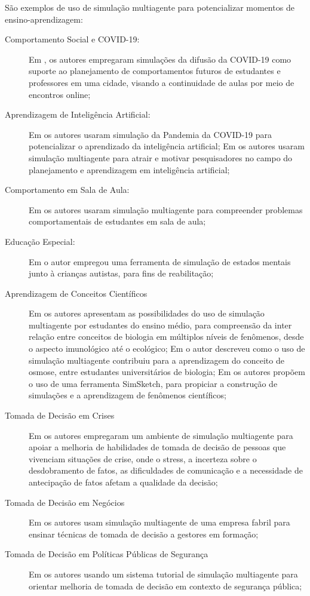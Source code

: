São exemplos de uso de simulação multiagente para potencializar momentos de ensino-aprendizagem:
\begin{description}
\item [Comportamento Social e COVID-19:] Em \cite{santoro_building_2020}, os autores empregaram simulações da difusão da COVID-19 como suporte ao planejamento de comportamentos futuros de estudantes e professores em uma cidade, visando a continuidade de aulas por meio de encontros online; 
\item [Aprendizagem de Inteligência Artificial:] Em \cite{juarez_analysis_2022} os autores usaram simulação da Pandemia da COVID-19 para potencializar o aprendizado da inteligência artificial; Em \cite{filho_proposal_2007} os autores usaram simulação multiagente para atrair e motivar pesquisadores no campo do planejamento e aprendizagem em inteligência artificial;
\item [Comportamento em Sala de Aula:] Em \cite{zhao_research_2011} os autores usaram simulação multiagente para compreender problemas comportamentais de estudantes em sala de aula;
\item [Educação Especial:] Em \cite{galitsky_computational_2013} o autor empregou uma ferramenta de simulação de estados mentais junto à crianças autistas, para fins de reabilitação;
\item [Aprendizagem de Conceitos Científicos]
Em \cite{wilensky_thinking_2006} os autores apresentam as possibilidades do uso de simulação multiagente por estudantes do ensino médio, para compreensão da inter relação entre conceitos de biologia em múltiplos níveis de fenômenos, desde o aspecto imunológico até o ecológico; Em \cite{kottonau_interactive_2011} o autor descreveu como o uso de simulação multiagente contribuiu para a aprendizagem do conceito de osmose, entre estudantes universitários de biologia; Em \cite{bollen_simsketch_2013} os autores propõem o uso de uma ferramenta SimSketch, para propiciar a construção de simulações e a aprendizagem de fenômenos científicos;
\item [Tomada de Decisão em Crises] Em \cite{tena-chollet_design_2016} os autores empregaram um ambiente de simulação multiagente para apoiar a melhoria de habilidades de tomada de decisão de pessoas que vivenciam  situações de crise, onde o stress, a incerteza sobre o desdobramento de fatos, as dificuldades de comunicação e a necessidade de antecipação de fatos afetam a qualidade da decisão; 
\item [Tomada de Decisão em Negócios] Em \cite{hishiyama_business_2015} os autores usam simulação multiagente de uma empresa fabril para ensinar técnicas de tomada de decisão a gestores em formação; 
\item [Tomada de Decisão em Políticas Públicas de Segurança] Em \cite{inproceedings} os autores usando um sistema tutorial de simulação multiagente para orientar melhoria de tomada de decisão em contexto de segurança pública;
\end{description}


